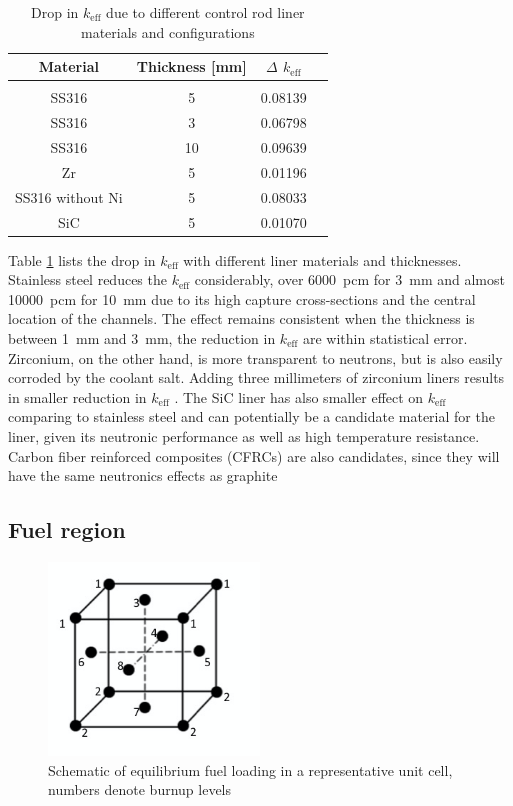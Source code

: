 \documentclass{elsarticle}
\newcommand{\keff}{{\ensuremath{k_{\mathrm{eff}}}} }
\begin{document}
\begin{table}
  \centering
  \begin{tabular}[h]{cccc}
    Material&Thickness [mm]& $\Delta$ \keff \\
    \hline\\
    SS316 & 5 & 0.08139\\
    SS316 & 3 & 0.06798\\
    SS316 & 10 & 0.09639\\
    Zr & 5 & 0.01196\\
    SS316 without Ni & 5 & 0.08033 \\
    SiC & 5 & 0.01070
  \end{tabular}
  \caption{Drop in \keff due to different control rod liner materials and configurations}
  \label{tab:ssliner}
\end{table}

Table \ref{tab:ssliner} lists the drop in \keff with different liner materials and thicknesses. Stainless steel reduces the \keff considerably, over 6000~pcm for 3~mm and almost 10000~pcm for 10~mm due to its high capture cross-sections and the central location of the channels. The effect remains consistent when the thickness is between 1~mm and 3~mm, the reduction in \keff are within statistical error.
Zirconium, on the other hand, is more transparent to neutrons, but is also easily corroded by the coolant salt. Adding three millimeters of zirconium liners results in smaller reduction in \keff. The SiC liner has also smaller effect on \keff comparing to stainless steel and can potentially be a candidate material for the liner, given its neutronic performance as well as high temperature resistance. Carbon fiber reinforced composites (CFRCs) are also candidates, since they will have the same neutronics effects as graphite





\subsection{Fuel region}

\begin{figure}[h]
  \centering
  \includegraphics[width=0.5\textwidth]{./images/design/fuel_loading_wall.png}
  \caption{Schematic of equilibrium fuel loading in a representative unit cell, numbers denote burnup levels}
  \label{fig:burnups}
\end{figure}
\end{document}
